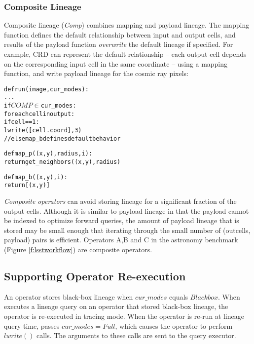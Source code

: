 \subsubsection{Composite Lineage}

Composite lineage ({\it Comp}) combines mapping and payload
lineage.  The mapping function defines the default relationship
between input and output cells, and results of the payload function
{\it overwrite} the default lineage if specified.    For example, CRD can
represent the default relationship -- each output cell depends on the
corresponding input cell in the same coordinate -- using a mapping
function, and write payload lineage for the cosmic ray
pixels:

{\footnotesize
\begin{alltt}
  def run(image,cur_modes):
    ...
    if \(COMP \in\) cur_modes:
       for each cell in output:
         if cell == 1:
          lwrite([cell.coord], 3)
      // else map_b defines default behavior

  def map_p((x,y), radius, i):
     return get_neighbors((x,y), radius)

  def map_b((x,y), i):
     return [(x,y)]
\end{alltt}
}

{\it Composite operators} can avoid storing lineage for a significant fraction
of the output cells.  Although it is similar to payload lineage in that the
payload cannot be indexed to optimize forward queries, the amount of payload
lineage that is stored may be small enough that iterating through the small
number of (outcells, payload) pairs is efficient.  Operators A,B and C in the
astronomy benchmark (Figure \ref{f:lsstworkflow}) are composite operators.

\subsection{Supporting Operator Re-execution}

An operator stores black-box lineage when $cur\_modes$ equals $Blackbox$.  When
\sys{} executes a lineage query on an operator that stored black-box lineage,
the operator is re-executed in tracing mode.   When the operator is re-run at
lineage query time, \sys{} passes $cur\_modes = Full$, which causes the
operator to perform $lwrite()$ calls.  The arguments to these calls are sent to
the query executor.

